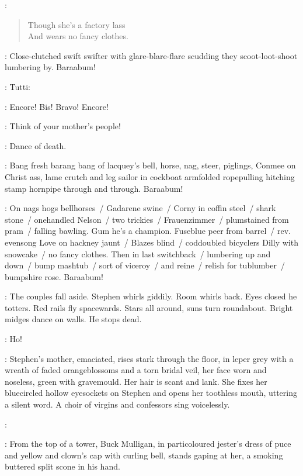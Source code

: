 \Pianola:
\begin{verse}
%
    Though she's a factory lass\\
    And wears no fancy clothes.
\end{verse}

:
Close-clutched swift swifter with glare-blare-flare scudding
they scoot-loot-shoot lumbering by.
Baraabum!

:
Tutti:

\All:
Encore!
Bis!
Bravo!
Encore!

\Simon[2]:
Think of your mother's people!

\Stephen:
Dance of death.

:
Bang fresh barang bang of lacquey's bell,
horse, nag, steer, piglings, Conmee on Christ ass,
lame crutch and leg sailor in cockboat armfolded
ropepulling hitching stamp hornpipe through and through.
Baraabum!

:
On nags hogs bellhorses~/ Gadarene swine~/ Corny in coffin steel~/ shark stone~/
onehandled Nelson~/ two trickies~/ Frauenzimmer~/ plumstained from pram~/ falling bawling.
Gum he's a champion.
Fuseblue peer from barrel~/ rev. evensong Love on hackney jaunt~/
Blazes blind~/ coddoubled bicyclers
Dilly with snowcake~/ no fancy clothes.
Then in last switchback~/ lumbering up and down~/ bump mashtub~/
sort of viceroy~/ and reine~/ relish for tublumber~/ bumpshire rose.
Baraabum!

:
The couples fall aside.
Stephen whirls giddily.
Room whirls back.
Eyes closed he totters.
Red rails fly spacewards.
Stars all around, suns turn roundabout.
Bright midges dance on walls.
He stops dead.

\Stephen:
Ho!

:
Stephen's mother, emaciated, rises stark through the floor,
in leper grey with a wreath of faded orangeblossoms and a torn bridal veil,
her face worn and noseless, green with gravemould.
Her hair is scant and lank.
She fixes her bluecircled hollow eyesockets on Stephen
and opens her toothless mouth, uttering a silent word.
A choir of virgins and confessors sing voicelessly.

\Choir:
\begin{verse}
\end{verse}

:
From the top of a tower, Buck Mulligan,
in particoloured jester's dress of puce and yellow
and clown's cap with curling bell, stands gaping at her,
a smoking buttered split scone in his hand.

